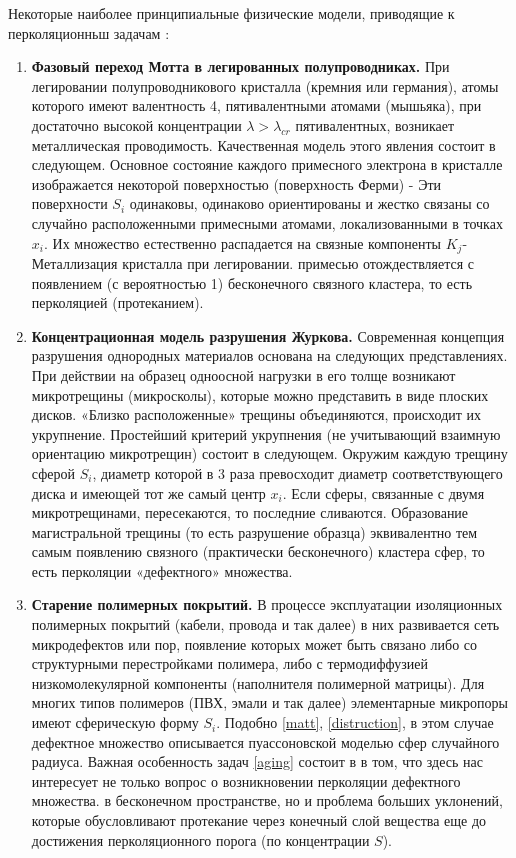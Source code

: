 Некоторые наиболее принципиальные физические модели, приводящие к перколяционньш задачам \cite{menshikov}:

\begin{enumerate}
    \item \label{matt}
    \textbf{Фазовый переход Мотта в легированных полупроводниках.} \newline
        При легировании полупроводникового кристалла (кремния или германия), атомы которого имеют валентность 4, пятивалентными атомами (мышьяка), при достаточно высокой концентрации $\lambda>\lambda_{cr}$ пятивалентных, возникает металлическая проводимость. Качественная модель этого явления состоит в следующем. Основное состояние каждого примесного электрона в кристалле изображается некоторой поверхностью (поверхность Ферми) - Эти поверхности $S_{i}$ одинаковы, одинаково ориентированы и жестко связаны со случайно расположенными примесными атомами, локализованными в точках $x_{i}$. Их множество естественно распадается на связные компоненты $K_{j}$- Металлизация кристалла при легировании. примесью отождествляется с появлением (с вероятностью 1) бесконечного связного кластера, то есть перколяцией (протеканием).
    \item \label{distruction}
    \textbf{Концентрационная модель разрушения Журкова.} \newline
        Современная концепция разрушения однородных материалов основана на следующих представлениях. При действии на образец одноосной нагрузки в его толще возникают микротрещины (микросколы), которые можно представить в виде плоских дисков. «Близко расположенные» трещины объединяются, происходит их укрупнение. Простейший критерий укрупнения (не учитывающий взаимную ориентацию микротрещин) состоит в следующем. Окружим каждую трещину сферой $S_{i}$, диаметр которой в $3$ раза превосходит диаметр соответствующего диска и имеющей тот же самый центр $x_{i}$. Если сферы, связанные с двумя микротрещинами, пересекаются, то последние сливаются. Образование магистральной трещины (то есть разрушение образца) эквивалентно тем самым появлению связного (практически бесконечного) кластера сфер, то есть перколяции «дефектного» множества.
    \item \label{aging}
    \textbf{Старение полимерных покрытий.} \newline
        В процессе эксплуатации изоляционных полимерных покрытий (кабели, провода и так далее) в них развивается сеть микродефектов или пор, появление которых может быть связано либо со структурными перестройками полимера, либо с термодиффузией низкомолекулярной компоненты (наполнителя полимерной матрицы). Для многих типов полимеров (ПВХ, эмали и так далее) элементарные микропоры имеют сферическую форму $S_{i}$. Подобно \ref{matt}, \ref{distruction}, в этом случае дефектное множество описывается пуассоновской моделью сфер случайного радиуса. Важная особенность задач \ref{aging} состоит в в том, что здесь нас интересует не только вопрос о возникновении перколяции дефектного множества. в бесконечном пространстве, но и проблема больших уклонений, которые обусловливают протекание через конечный слой вещества еще до достижения перколяционного порога (по концентрации $S$).

\end{enumerate}
